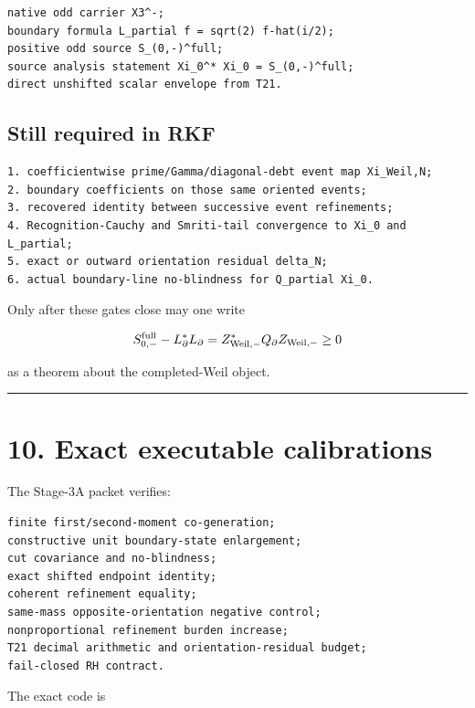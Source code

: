 \begin{verbatim}
native odd carrier X3^-;
boundary formula L_partial f = sqrt(2) f-hat(i/2);
positive odd source S_(0,-)^full;
source analysis statement Xi_0^* Xi_0 = S_(0,-)^full;
direct unshifted scalar envelope from T21.
\end{verbatim}

\hypertarget{still-required-in-rkf}{%
\subsection{Still required in RKF}\label{still-required-in-rkf}}

\begin{verbatim}
1. coefficientwise prime/Gamma/diagonal-debt event map Xi_Weil,N;
2. boundary coefficients on those same oriented events;
3. recovered identity between successive event refinements;
4. Recognition-Cauchy and Smriti-tail convergence to Xi_0 and L_partial;
5. exact or outward orientation residual delta_N;
6. actual boundary-line no-blindness for Q_partial Xi_0.
\end{verbatim}

Only after these gates close may one write

\[
S_{0,-}^{\rm full}-L_\partial^*L_\partial
=Z_{\rm Weil,-}^*Q_\partial Z_{\rm Weil,-}
\ge0
\]

as a theorem about the completed-Weil object.

\begin{center}\rule{0.5\linewidth}{0.5pt}\end{center}

\hypertarget{exact-executable-calibrations}{%
\section{10. Exact executable calibrations}\label{exact-executable-calibrations}}

The Stage-3A packet verifies:

\begin{verbatim}
finite first/second-moment co-generation;
constructive unit boundary-state enlargement;
cut covariance and no-blindness;
exact shifted endpoint identity;
coherent refinement equality;
same-mass opposite-orientation negative control;
nonproportional refinement burden increase;
T21 decimal arithmetic and orientation-residual budget;
fail-closed RH contract.
\end{verbatim}

The exact code is

